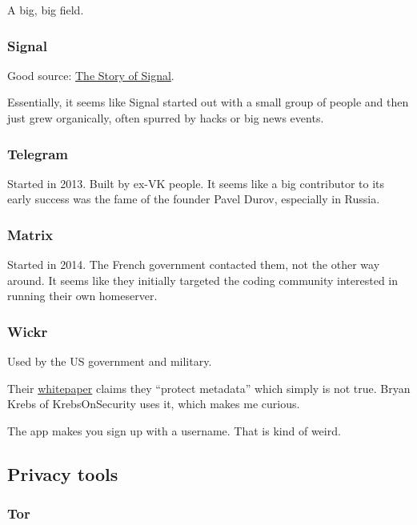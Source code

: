 \documentclass[sigconf, nonacm, balance=false, natbib=false]{acmart}
\begin{document}
A big, big field.

\subsubsection{Signal}

Good source: \href{https://increment.com/security/story-of-signal/}{The Story of Signal}.

Essentially, it seems like Signal started out with a small group of people and then just grew organically, often spurred by hacks or big news events.

\subsubsection{Telegram}

Started in 2013. Built by ex-VK people. It seems like a big contributor to its early success was the fame of the founder Pavel Durov, especially in Russia.

\subsubsection{Matrix}

Started in 2014. The French government contacted them, not the other way around. It seems like they initially targeted the coding community interested in running their own homeserver.

\subsubsection{Wickr}

Used by the US government and military.

Their \href{https://wickr.com/wp-content/uploads/2019/12/WhitePaper_WickrMessagingProtocol.pdf}{whitepaper} claims they ``protect metadata'' which simply is not true. Bryan Krebs of KrebsOnSecurity uses it, which makes me curious.

The app makes you sign up with a username. That is kind of weird.

\subsection{Privacy tools}

\subsubsection{Tor}
\end{document}
